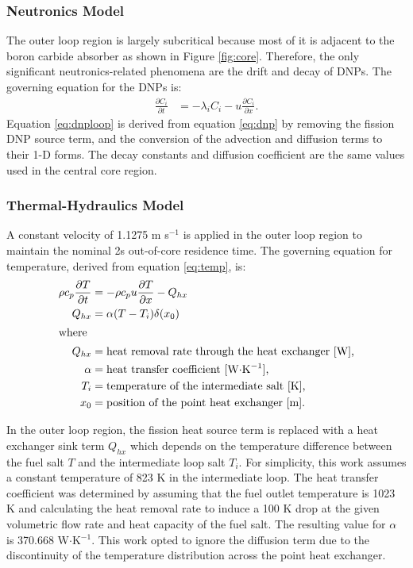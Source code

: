 \subsubsection{Neutronics Model}

The outer loop region is largely subcritical because most of it is adjacent to
the boron carbide absorber as shown in Figure \ref{fig:core}. Therefore, the
only significant neutronics-related phenomena are the drift and decay of
\glspl{DNP}. The governing equation for the \glspl{DNP} is:
%
\begin{align}
    \frac{\partial C_i}{\partial t} &= - \lambda_i C_i - u
    \frac{\partial C_i}{\partial x}.
    \label{eq:dnploop}
\end{align}
%
Equation \ref{eq:dnploop} is derived from equation \ref{eq:dnp} by removing
the fission \gls{DNP} source term, and the conversion of the advection and
diffusion terms to their 1-D forms. The decay constants and diffusion
coefficient are the same values used in the central core region.

\subsubsection{Thermal-Hydraulics Model}

A constant velocity of 1.1275 m s$^{-1}$ is applied in the outer loop region
to maintain the nominal 2s out-of-core residence time. The governing equation
for temperature, derived from equation \ref{eq:temp}, is:
%
\begin{align}
    \rho c_{p} \frac{\partial T}{\partial t} &= - \rho c_p u
    \frac{\partial T}{\partial x} - Q_{hx} \label{eq:temploop} \\
    Q_{hx} &= \alpha (T - T_i) \delta (x_0) \label{eq:hx} \\
    \intertext{where}
    Q_{hx} &= \text{heat removal rate through the heat exchanger [W],} 
    \nonumber \\
    \alpha &= \text{heat transfer coefficient [W$\cdot$K$^{-1}$],} \nonumber
    \\
    T_i &= \text{temperature of the intermediate salt [K],} \nonumber \\
    x_0 &= \text{position of the point heat exchanger [m].} \nonumber
\end{align}

In the outer loop region, the fission heat source term is replaced with a heat
exchanger sink term $Q_{hx}$
which depends on the temperature difference between the fuel salt $T$ and the
intermediate loop salt $T_i$. For simplicity, this work assumes a constant
temperature of 823 K in the intermediate loop. The heat transfer coefficient
was determined by assuming that the fuel outlet temperature is 1023 K and
calculating the heat removal rate to induce a 100 K drop at the given
volumetric flow rate and heat capacity of the fuel salt. The resulting value
for $\alpha$ is 370.668 W$\cdot$K$^{-1}$. This work opted to
ignore the diffusion term due to the discontinuity of the temperature
distribution across the point heat exchanger. 

